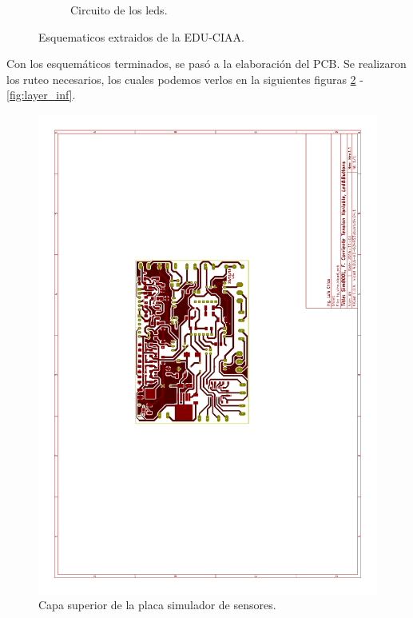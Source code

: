 \begin{figure}[!hp]
\begin{subfigure}{0.4\textwidth}
    \caption{Circuito de los leds.}
  \end{subfigure}
  \caption{Esquematicos extraidos de la EDU-CIAA.}
  \label{fig:pul_leda_pulses}
\end{figure}

Con los esquemáticos terminados, se pasó a la elaboración del PCB. Se realizaron los ruteo necesarios, los cuales podemos verlos en la siguientes figuras \ref{fig:layer_sup} - \ref{fig:layer_inf}.
\begin{figure}[!hp]
  \centering
  \includegraphics[page=1,angle=270,clip,trim=5.5cm 10cm 7.7cm 8.5cm]{./Figures/pcb_layer.pdf}
  \caption{Capa superior de la placa simulador de sensores.}
  \label{fig:layer_sup}
\end{figure}
